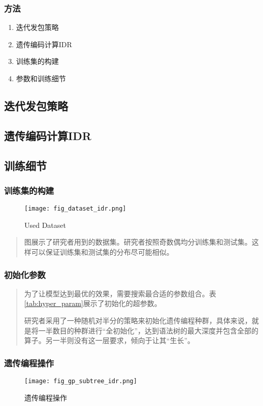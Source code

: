 \begin{frame}
    \frametitle{方法}
    \begin{enumerate}
        \item 迭代发包策略
        \item 遗传编码计算IDR
        \item 训练集的构建
        \item 参数和训练细节
    \end{enumerate}
\end{frame}

\subsection{迭代发包策略}

\subsection{遗传编码计算IDR}

\subsection{训练细节}
\begin{frame}
    \frametitle{训练集的构建}
    \begin{figure}[H]
        \texttt{[image: fig\_dataset\_idr.png]}
        \caption{Used Dataset}
        \label{fig:dataset_idr}
    \end{figure}
    \begin{quote}
    图\label{fig:dataset_idr}展示了研究者用到的数据集。研究者按照奇数偶均分训练集和测试集。这样可以保证训练集和测试集的分布尽可能相似。
    \end{quote}    
\end{frame}
\begin{frame}
    \frametitle{初始化参数}
    
    \begin{quote}
        为了让模型达到最优的效果，需要搜索最合适的参数组合。表\ref{tab:hyper_param}展示了初始化的超参数。
        
        研究者采用了一种随机对半分的策略来初始化遗传编程种群，具体来说，就是将一半数目的种群进行“全初始化”，达到语法树的最大深度并包含全部的算子。另一半则没有这一层要求，倾向于让其“生长”。
    \end{quote}    
\end{frame}


\begin{frame}
    \frametitle{遗传编程操作}
    \begin{figure}[H]
        \texttt{[image: fig\_gp\_subtree\_idr.png]}
        \caption{遗传编程操作}
        \label{fig:gp_subtree_idr}
    \end{figure}    
\end{frame}